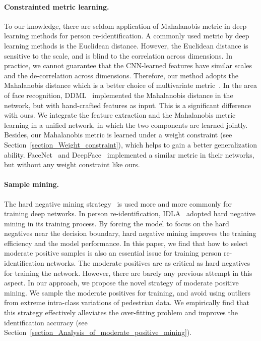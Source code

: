 \documentclass[10pt,twocolumn,letterpaper]{article}
\begin{document}
\paragraph{Constrainted metric learning.}
To our knowledge, there are seldom application of Mahalanobis metric in deep learning methods for person re-identification.
A commonly used metric by deep learning methods is the Euclidean distance.
However, the Euclidean distance is sensitive to the scale, and is blind to the correlation across dimensions.
In practice, we cannot guarantee that the CNN-learned features have similar scales and the de-correlation across dimensions.
Therefore, our method adopts the Mahalanobis distance which is a better choice of multivariate metric~\cite{manly2004multivariate}.
In the area of face recognition, DDML~\cite{hu2014discriminative} implemented the Mahalanobis distance in the network, but with hand-crafted features as input.
This is a significant difference with ours. We integrate the feature extraction and the Mahalanobis metric learning in a unified network, in which the two components are learned jointly.
Besides, our Mahalanobis metric is learned under a weight constraint (see Section~\ref{section_Weight_constraint}), which helps to gain a better generalization ability.
FaceNet~\cite{schroff2015facenet} and DeepFace~\cite{parkhi2015deep} implemented a similar metric in their networks, but without any weight constraint like ours.

\paragraph{Sample mining.}
The hard negative mining strategy~\cite{schroff2015facenet} is used more and more commonly for training deep networks.
In person re-identification, IDLA~\cite{ahmed2015improved} adopted hard negative mining in its training process.
By forcing the model to focus on the hard negatives near the decision boundary, hard negative mining improves the training efficiency and the model performance.
In this paper, we find that how to select moderate positive samples is also an essential issue for training person re-identification networks.
The moderate positives are as critical as hard negatives for training the network. However, there are barely any previous attempt in this aspect.
In our approach, we propose the novel strategy of moderate positive mining.
We sample the moderate positives for training, and avoid using outliers from extreme intra-class variations of pedestrian data.
We empirically find that this strategy effectively alleviates the over-fitting problem and improves the identification accuracy (see Section~\ref{section_Analysis_of_moderate_positive_mining}).
\end{document}
